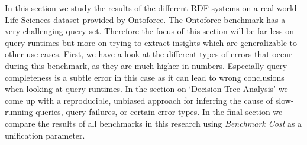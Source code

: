 \documentclass[twocolumn]{bmcart}%
\newcommand\todo[1]{\textcolor{red}{#1}}
\begin{document}
In this section we study the results of the different RDF systems on a real-world Life Sciences dataset provided by Ontoforce. 
The Ontoforce benchmark has a very challenging query set. Therefore the focus of this section will be far less on query runtimes but more on trying to extract insights which are generalizable to other use cases.
First, we have a look at the different types of errors that occur during this benchmark, as they are much higher in numbers. Especially query completeness is a subtle error in this case as it can lead to wrong conclusions when looking at query runtimes. 
In the section on `Decision Tree Analysis' we come up with a reproducible, unbiased approach for inferring the cause of slow-running queries, query failures, or certain error types. 
In the final section we compare the results of all benchmarks in this research using \emph{Benchmark Cost} as a unification parameter. 


%
\end{document}
